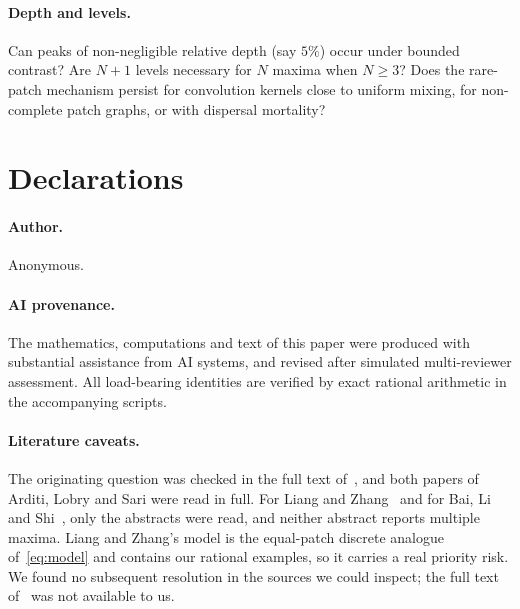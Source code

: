\documentclass[11pt]{article}
\theoremstyle{remark}
\begin{document}
\paragraph{Depth and levels.}
Can peaks of non-negligible relative depth (say \(5\%\)) occur under
bounded contrast? Are \(N+1\) levels necessary for \(N\) maxima when
\(N\ge3\)? Does the rare-patch mechanism persist for convolution kernels
close to uniform mixing, for non-complete patch graphs, or with dispersal
mortality?

\section*{Declarations}

\paragraph{Author.} Anonymous.

\paragraph{AI provenance.} The mathematics, computations and text of this
paper were produced with substantial assistance from AI systems, and
revised after simulated multi-reviewer assessment. All load-bearing
identities are verified by exact rational arithmetic in the accompanying
scripts.

\paragraph{Literature caveats.} The originating question was checked in
the full text of~\cite{BaiLi2021}, and both papers of Arditi, Lobry and
Sari were read in full. For Liang and Zhang~\cite{LiangZhang2021} and for
Bai, Li and Shi~\cite{BaiLiShi2024}, only the abstracts were read, and
neither abstract reports multiple maxima. Liang and Zhang's model is the
equal-patch discrete analogue of~\eqref{eq:model} and contains our
rational examples, so it carries a real priority risk. We found no
subsequent resolution in the sources we could inspect; the full text
of~\cite{BaiLiShi2024} was not available to us.
\end{document}
